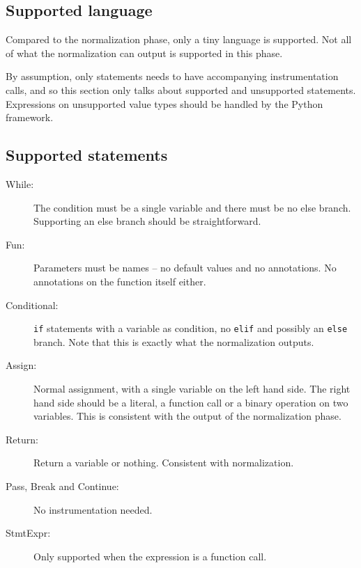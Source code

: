 \documentclass[11pt]{report}
\begin{document}
\begin{description}
\section{Supported language}
Compared to the normalization phase, only a tiny language is
supported. Not all of what the normalization can output is supported
in this phase.

By assumption, only statements needs to have accompanying
instrumentation calls, and so this section only talks about supported
and unsupported statements. Expressions on unsupported value types
should be handled by the Python framework.

\subsection{Supported statements}
\begin{description}
  \item[While:] The condition must be a single variable and there must
    be no else branch. Supporting an else branch should be
    straightforward.
  \item[Fun:] Parameters must be names -- no default values and no
    annotations. No annotations on the function itself either.
  \item[Conditional:] \verb|if| statements with a variable as
    condition, no \verb|elif| and possibly an \verb|else| branch. Note
    that this is exactly what the normalization outputs.
  \item[Assign:] Normal assignment, with a single variable on the left
    hand side. The right hand side should be a literal, a function
    call or a binary operation on two variables. This is consistent
    with the output of the normalization phase.
  \item[Return:] Return a variable or nothing. Consistent with
    normalization.
  \item[Pass, Break and Continue:] No instrumentation needed.
  \item[StmtExpr:] Only supported when the expression is a function
    call.
\end{description}


\end{description}
\end{document}
